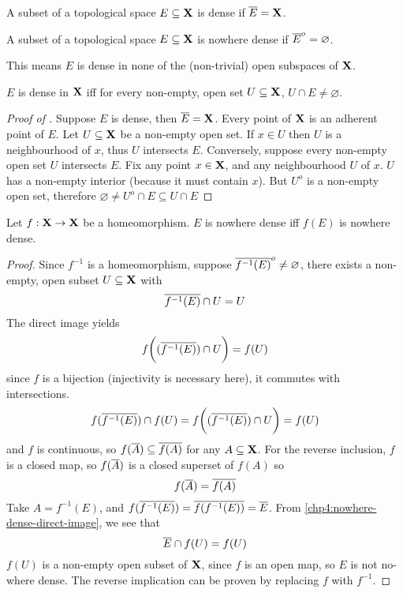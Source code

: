 \documentclass[../../main.tex]{subfiles}
\begin{document}
\newpage

\begin{definition}\label{chp4:dense-definition}
    A subset of a topological space $E\subseteq{\mathbf{X}}$ is dense if $\overline{E} = {\mathbf{X}}$.
\end{definition}

\begin{definition}\label{chp4:nowhere-dense-definition}
    A subset of a topological space $E\subseteq{\mathbf{X}}$ is nowhere dense if $\overline{E}^o = \varnothing$.
    
    This means $E$ is dense in none of the (non-trivial) open subspaces of ${\mathbf{X}}$.
\end{definition}

\begin{wts}\label{chp4:dense-equivalences}
    $E$ is dense in ${\mathbf{X}}$ iff for every non-empty, open set $U\subseteq{\mathbf{X}}$, $U\cap E\neq\varnothing$.
\end{wts}
\begin{proof}[Proof of ]
    Suppose $E$ is dense, then $\overline{E}={\mathbf{X}}$. Every point of ${\mathbf{X}}$ is an adherent point of $E$. Let $U\subseteq {\mathbf{X}}$ be a non-empty open set. If $x\in U$ then $U$ is a neighbourhood of $x$, thus $U$ intersects $E$. Conversely, suppose every non-empty open set $U$ intersects $E$. Fix any point $x\in{\mathbf{X}}$, and any neighbourhood $U$ of $x$. $U$ has a non-empty interior (because it must contain $x$). But $U^o$ is a non-empty open set, therefore $\varnothing\neq U^o\cap E\subseteq U\cap E$
\end{proof}

\begin{wts}\label{chp4:nowhere-dense-homeomorphisms}
    Let $f:{\mathbf{X}}\to{\mathbf{X}}$ be a homeomorphism. $E$ is nowhere dense iff $f(E)$ is nowhere dense.
\end{wts}
\begin{proof}
    Since $f^{-1}$ is a homeomorphism, suppose $\overline{f^{-1}(E)}^o\neq\varnothing$, there exists a non-empty, open subset $U\subseteq{\mathbf{X}}$ with
    \[
        \overline{f^{-1}(E)}\cap U = U
    \]
    The direct image yields 
    \[
        f\biggl((\overline{f^{-1}(E)})\cap U\biggr) = f(U)
    \]
    since $f$ is a bijection (injectivity is necessary here), it commutes with intersections.
    \begin{equation}\label{chp4:nowhere-dense-direct-image}
        f(\overline{f^{-1}(E)})\cap f(U) = f\biggl((\overline{f^{-1}(E)})\cap U\biggr) = f(U)
    \end{equation}
    and $f$ is continuous, so $f(\overline{A})\subseteq\overline{f(A)}$ for any $A\subseteq{\mathbf{X}}$. For the reverse inclusion, $f$ is a closed map, so $f(\overline{A})$ is a closed superset of $f(A)$ so 
    \[
        f(\overline{A}) = \overline{f(A)}
    \]
    Take $A = f^{-1}(E)$, and $f(\overline{f^{-1}(E)}) = \overline{f(f^{-1}(E))} = \overline{E}$. From \cref{chp4:nowhere-dense-direct-image}, we see that
    \[
        \overline{E}\cap f(U) = f(U)
    \]
    $f(U)$ is a non-empty open subset of ${\mathbf{X}}$, since $f$ is an open map, so $E$ is not no-where dense. The reverse implication can be proven by replacing $f$ with $f^{-1}$.
\end{proof}
\end{document}
